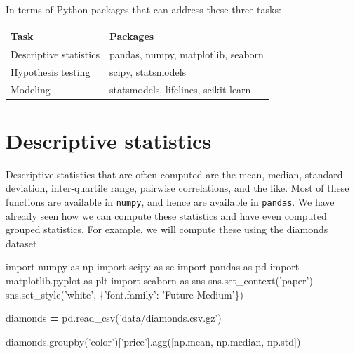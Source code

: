 \documentclass[
  letterpaper,
]{scrbook}
\newenvironment{Shaded}{\begin{snugshade}}{\end{snugshade}}
\newcommand{\ImportTok}[1]{#1}
\newcommand{\NormalTok}[1]{#1}
\newcommand{\OperatorTok}[1]{\textcolor[rgb]{0.81,0.36,0.00}{\textbf{#1}}}
\newcommand{\StringTok}[1]{\textcolor[rgb]{0.31,0.60,0.02}{#1}}
\begin{document}
In terms of Python packages that can address these three tasks:

\begin{longtable}[]{@{}ll@{}}
\toprule
Task & Packages\tabularnewline
\midrule
\endhead
Descriptive statistics & pandas, numpy, matplotlib, seaborn\tabularnewline
Hypothesis testing & scipy, statsmodels\tabularnewline
Modeling & statsmodels, lifelines, scikit-learn\tabularnewline
\bottomrule
\end{longtable}

\hypertarget{descriptive-statistics}{%
\section{Descriptive statistics}\label{descriptive-statistics}}

Descriptive statistics that are often computed are the mean, median, standard deviation, inter-quartile range, pairwise correlations, and the like. Most of these functions are available in \texttt{numpy}, and hence are available in \texttt{pandas}. We have already seen how we can compute these statistics and have even computed grouped statistics. For example, we will compute these using the diamonds dataset

\begin{Shaded}
\begin{Highlighting}[]
\ImportTok{import}\NormalTok{ numpy }\ImportTok{as}\NormalTok{ np}
\ImportTok{import}\NormalTok{ scipy }\ImportTok{as}\NormalTok{ sc}
\ImportTok{import}\NormalTok{ pandas }\ImportTok{as}\NormalTok{ pd}
\ImportTok{import}\NormalTok{ matplotlib.pyplot }\ImportTok{as}\NormalTok{ plt}
\ImportTok{import}\NormalTok{ seaborn }\ImportTok{as}\NormalTok{ sns}
\NormalTok{sns.set_context(}\StringTok{'paper'}\NormalTok{)}
\NormalTok{sns.set_style(}\StringTok{'white'}\NormalTok{, \{}\StringTok{'font.family'}\NormalTok{: }\StringTok{'Future Medium'}\NormalTok{\})}
\end{Highlighting}
\end{Shaded}

\begin{Shaded}
\begin{Highlighting}[]
\NormalTok{diamonds }\OperatorTok{=}\NormalTok{ pd.read_csv(}\StringTok{'data/diamonds.csv.gz'}\NormalTok{)}
\end{Highlighting}
\end{Shaded}

\begin{Shaded}
\begin{Highlighting}[]
\NormalTok{diamonds.groupby(}\StringTok{'color'}\NormalTok{)[}\StringTok{'price'}\NormalTok{].agg([np.mean, np.median, np.std])}
\end{Highlighting}
\end{Shaded}
\end{document}
